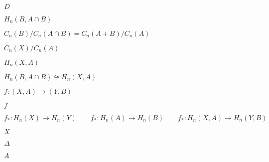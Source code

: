 \documentclass[10pt]{book}
\begin{document}
\begin{mdSnippets}
\begin{mdInlineSnippet}[f623e75af30e62bbd73d6df5b50bb7b5]%
$D$\end{mdInlineSnippet}%
\begin{mdInlineSnippet}%
$H_n(B, A \cap B)$\end{mdInlineSnippet}%
\begin{mdInlineSnippet}[c49e35a0b69d383a310fe573f1bd1a5d]%
$C_n(B) / C_n(A \cap B) = C_n(A+B) / C_n(A)$\end{mdInlineSnippet}%
\begin{mdInlineSnippet}%
$C_n(X) / C_n(A)$\end{mdInlineSnippet}%
\begin{mdInlineSnippet}[b0c4475880528253a72c2ac54a24ab3f]%
$H_n(X, A)$\end{mdInlineSnippet}%
\begin{mdInlineSnippet}%
$H_n(B, A \cap B) \cong H_n(X, A)$\end{mdInlineSnippet}%
\begin{mdInlineSnippet}%
$f: (X,A) \to (Y,B)$\end{mdInlineSnippet}%
\begin{mdInlineSnippet}%
$f$\end{mdInlineSnippet}%
\begin{mdDisplaySnippet}[95228618035b05d3ec66e1bb43d110b4]%
\[%
f_*: H_n(X) \to H_n(Y) \qquad
f_*: H_n(A) \to H_n(B) \qquad
f_*: H_n(X,A) \to H_n(Y,B)
\]%
\end{mdDisplaySnippet}%
\begin{mdInlineSnippet}[02129bb861061d1a052c592e2dc6b383]%
$X$\end{mdInlineSnippet}%
\begin{mdInlineSnippet}[967878d1da852d4b07a961e3168b0fff]%
$\Delta$\end{mdInlineSnippet}%
\begin{mdInlineSnippet}[7fc56270e7a70fa81a5935b72eacbe29]%
$A$\end{mdInlineSnippet}%
\begin{mdInlineSnippet}[02129bb861061d1a052c592e2dc6b383]%

\end{mdInlineSnippet}
\end{mdSnippets}
\end{document}
